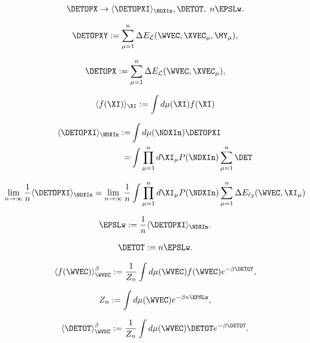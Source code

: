 \begin{align}
  \label{eqn:Emap}
  \DETOPX\rightarrow \langle\DETOPXI\rangle_{\NDXIn}, \DETOT,\;n\EPSLw  .
\end{align}

\begin{align}
  \label{eqn:detopxy}
  \DETOPXY :=\sum_{\mu=1}^{n}\Delta E_{\mathcal{L}}(\WVEC,\XVEC_{\mu}, \MY_{\mu})  ,
\end{align}

\begin{align}
  \label{eqn:detopx}
  \DETOPX :=\sum_{\mu=1}^{n}\Delta E_{\mathcal{L}}(\WVEC,\XVEC_{\mu})  ,
\end{align}

\begin{align}
 \label{eqn:EuT}
 \langle f(\XI) \rangle_{\XI}:=\int d\mu(\XI) f(\XI) 
\end{align}

\begin{align}
  \langle \DETOPXI\rangle_{\NDXIn}
:=  &\int d\mu(\NDXIn) \DETOPXI \\ \nonumber
 = & \int \prod_{\mu=1}^{n}d\XI_{\mu}P(\NDXIn) \sum_{\mu=1}^{n}\DET
\end{align}

\begin{align}
  \lim_{n\rightarrow\infty}  \frac{1}{n}\langle\DETOPXI\rangle_{\NDXIn}=
  \lim_{n\rightarrow\infty}\frac{1}{n}
\int \prod_{\mu=1}^{n}d\XI_{\mu}P(\NDXIn)
  \sum_{\mu=1}^{n}\Delta E_{\ell_2}(\WVEC,\XI_{\mu})
\end{align}

\begin{align}
 \label{eqn:epsl}
 \EPSLw:=\frac{1}{n}\langle \DETOPXI \rangle_{\NDXIn}  .
\end{align}

\begin{align}
 \label{eqn:detox}
 \DETOT := n\EPSLw.
\end{align}

\begin{align}
\label{eqn:thrmavg}
\langle f(\WVEC)\rangle_{\WVEC}^{{\beta}}:=\dfrac{1}{Z_{n}}\int d\mu(\WVEC) f(\WVEC)e^{-\beta \DETOT}  ,
\end{align}

\begin{align}
\label{eqn:Zwn}
Z_{n}:=\int d\mu(\WVEC) e^{-\beta n\EPSLw},
\end{align}

\begin{align}
\label{eqn:Detot}
\langle \DETOT \rangle^{\beta}_{\WVEC}:=\dfrac{1}{Z_{n}}\int d\mu(\WVEC) \DETOT e^{-\beta \DETOT} .
\end{align}

